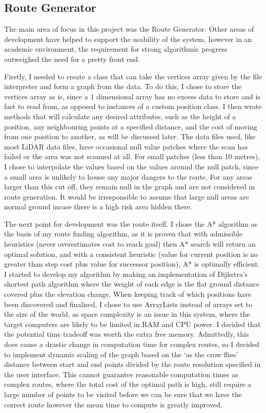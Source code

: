 \documentclass[12pt,a4paper]{article}
\begin{document}
  \subsection{Route Generator}
  \noindent The main area of focus in this project was the Route Generator. Other areas of development have helped to support the usability of the system, however in an academic environment, the requirement for strong algorithmic progress outweighed the need for a pretty front end.
  \par Firstly, I needed to create a class that can take the vertices array given by the file interpreter and form a graph from the data. To do this, I chose to store the vertices array as is, since a 1 dimensional array has no excess data to store and is fast to read from, as opposed to instances of a custom position class. I then wrote methods that will calculate any desired attributes, such as the height of a position, any neighbouring points at a specified distance, and the cost of moving from one position to another, as will be discussed later. The data files used, like most LiDAR data files, have occasional null value patches where the scan has failed or the area was not scanned at all. For small patches (less than 10 metres), I chose to interpolate the values based on the values around the null patch, since a small area is unlikely to house any major dangers to the route. For any areas larger than this cut off, they remain null in the graph and are not considered in route generation. It would be irresponsible to assume that large null areas are normal ground incase there is a high risk area hidden there.
  \par The next point for development was the route itself. I chose the A* algorithm as the basis of my route finding algorithm, as it is proven that with admissible heuristics (never overestimates cost to reach goal) then A* search will return an optimal solution, and with a consistent heuristic (value for current position is no greater than step cost plus value for successor position), A* is optimally efficient.\cite{stewart_ai_search} I started to develop my algorithm by making an implementation of Dijkstra's shortest path algorithm where the weight of each edge is the flat ground distance covered plus the elevation change. When keeping track of which positions have been discovered and finalised, I chose to use ArrayLists instead of arrays set to the size of the world, as space complexity is an issue in this system, where the target computers are likely to be limited in RAM and CPU power. I decided that the potential time tradeoff was worth the extra free memory. Admittedly, this does cause a drastic change in computation time for complex routes, so I decided to implement dynamic scaling of the graph based on the `as the crow flies' distance between start and end points divided by the route resolution specified in the user interface. This cannot guarantee reasonable computation times as complex routes, where the total cost of the optimal path is high, still require a large number of points to be visited before we can be sure that we have the correct route however the mean time to compute is greatly improved.
\end{document}
